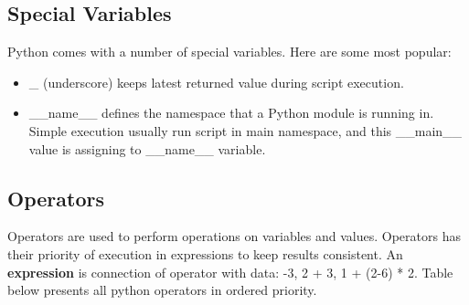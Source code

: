 \documentclass{article}
\begin{document}
	\newpage
	\subsection{Special Variables}
	Python comes with a number of special variables. Here are some most popular:
\begin{itemize}
	\item \_ (underscore) keeps latest returned value during script execution.
	\item \_\_name\_\_ defines the namespace that a Python module is running in. Simple execution  usually run script in main namespace, and this \_\_main\_\_ value is assigning to \_\_name\_\_ variable.
\end{itemize}
	

		\newpage
	\subsection{Operators}
	Operators are used to perform operations on variables and values. Operators has their priority of execution in expressions to keep results consistent. An \textbf{expression} is connection of operator with data: -3, 2 + 3, 1 + (2-6) * 2.
	Table below presents all python operators in ordered priority.
\end{document}
